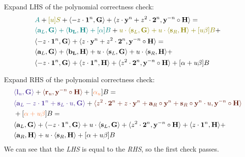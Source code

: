\documentclass[../../book.tex]{subfiles}
\begin{document}
Expand LHS of the polynomial correctness check:
\begin{equation*}
    \begin{aligned}
        &\textcolor{teal}{A} + \textcolor{olive}{[u]S} + \langle -z \cdot \mathbf{1}^n, \mathbf{G} \rangle + \langle z \cdot \mathbf{y}^n + z^2 \cdot \mathbf{2}^n, \mathbf{y}^{-n} \circ \mathbf{H} \rangle = \\
        &\textcolor{teal}{\langle \mathbf{a}_L, \mathbf{G} \rangle + \langle \mathbf{b_L}, \mathbf{H} \rangle + [\alpha]B} + \textcolor{olive}{u \cdot \langle \mathbf{s}_L, \mathbf{G} \rangle + u \cdot \langle \mathbf{s}_R, \mathbf{H} \rangle + [u\beta]B} + \\
        & \langle -z \cdot \mathbf{1}^n, \mathbf{G} \rangle + \langle z \cdot \mathbf{y}^n + z^2 \cdot \mathbf{2}^n, \mathbf{y}^{-n} \circ \mathbf{H} \rangle = \\
        &\langle \mathbf{a}_L, \mathbf{G} \rangle + \langle \mathbf{b_L}, \mathbf{H} \rangle + u \cdot \langle \mathbf{s}_L, \mathbf{G} \rangle + u \cdot \langle \mathbf{s}_R, \mathbf{H} \rangle + \\
        &\langle -z \cdot \mathbf{1}^n, \mathbf{G} \rangle + \langle z \cdot \mathbf{1}^n, \mathbf{H} \rangle + \langle z^2 \cdot \mathbf{2}^n, \mathbf{y}^{-n} \circ \mathbf{H} \rangle + [\alpha + u\beta]B
    \end{aligned}
\end{equation*}

Expand RHS of the polynomial correctness check:
\begin{equation*}
    \begin{aligned}
        &\textcolor{Violet}{\langle \mathbf{l}_u, \mathbf{G} \rangle} + \textcolor{Sepia}{\langle \mathbf{r}_u, \mathbf{y}^{-n} \circ \mathbf{H} \rangle} + [\textcolor{Peach}{\alpha_u}]B = \\
        &\textcolor{Violet}{\langle \mathbf{a}_L - z \cdot \mathbf{1}^n + \mathbf{s}_L \cdot u, \mathbf{G} \rangle} + \textcolor{Sepia}{\langle z^2 \cdot \mathbf{2}^n + z \cdot \mathbf{y}^n + \mathbf{a}_R \circ \mathbf{y}^n + \mathbf{s}_R \circ \mathbf{y}^n \cdot u, \mathbf{y}^{-n} \circ \mathbf{H} \rangle} \\ 
        &+ [\textcolor{Peach}{\alpha + u\beta}]B = \\
        & \langle \mathbf{a}_L, \mathbf{G} \rangle + \langle -z \cdot \mathbf{1}^n, \mathbf{G} \rangle + u \cdot \langle \mathbf{s}_L, \mathbf{G} \rangle + \langle z^2 \cdot \mathbf{2}^n, \mathbf{y}^{-n} \circ \mathbf{H} \rangle + \langle z \cdot \mathbf{1}^n, \mathbf{H} \rangle + \\
        & \langle \mathbf{a}_R, \mathbf{H} \rangle + u\cdot \langle \mathbf{s}_R, \mathbf{H} \rangle + [\alpha + u\beta]B
    \end{aligned}
\end{equation*}
We can see that the \textit{LHS} is equal to the \textit{RHS}, so the first check passes.
\end{document}
